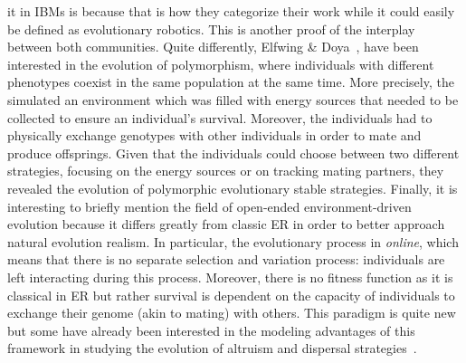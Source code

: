 it in IBMs is because that is how they categorize their work while it could easily be defined as evolutionary robotics. This is another proof of the interplay between both communities. Quite differently, Elfwing \& Doya~\parencite{Elfwing2014a}, have been interested in the evolution of polymorphism, where individuals with different phenotypes coexist in the same population at the same time. More precisely, the simulated an environment which was filled with energy sources that needed to be collected to ensure an individual's survival. Moreover, the individuals had to physically exchange genotypes with other individuals in order to mate and produce offsprings. Given that the individuals could choose between two different strategies, focusing on the energy sources or on tracking mating partners, they revealed the evolution of polymorphic evolutionary stable strategies. Finally, it is interesting to briefly mention the field of open-ended environment-driven evolution because it differs greatly from classic ER in order to better approach natural evolution realism. In particular, the evolutionary process in \emph{online}, which means that there is no separate selection and variation process: individuals are left interacting during this process. Moreover, there is no fitness function as it is classical in ER but rather survival is dependent on the capacity of individuals to exchange their genome (akin to mating) with others. This paradigm is quite new~\parencite{Bredeche2010, Bredeche2012} but some have already been interested in the modeling advantages of this framework in studying the evolution of altruism and dispersal strategies~\parencite{Montanier2011, Montanier2013}.

